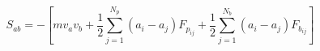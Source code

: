 \documentclass[12pt]{article}
\begin{document}
$$
   S_{ab} = - \left[ m v_a v_b + 
     \frac{1}{2} \sum_{j = 1}^{N_p} (a_i - a_j) F_{p_{ij}} +
     \frac{1}{2} \sum_{j = 1}^{N_b} (a_i - a_j) F_{b_{ij}} \right]
$$
\end{document}
